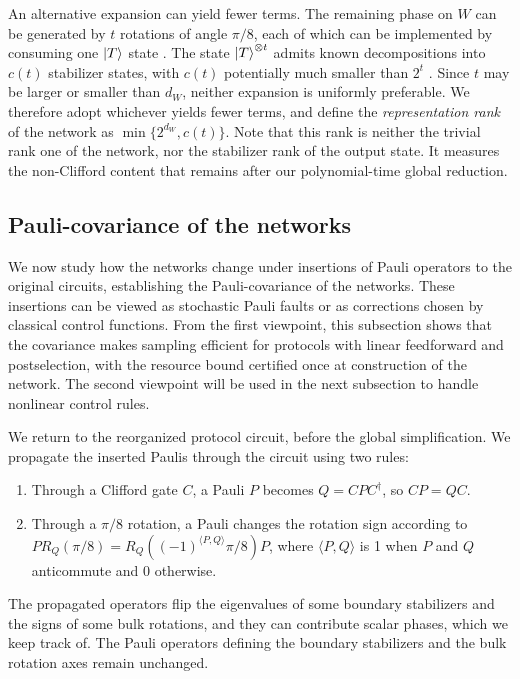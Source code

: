\documentclass[aps,prx,twocolumn,superscriptaddress,longbibliography]{revtex4-2}
\begin{document}
An alternative expansion can yield fewer terms. 
The remaining phase on $W$ can be generated by $t$ rotations of angle $\pi/8$, 
each of which can be implemented by consuming one $\ket{T}$ state \cite{litinskiGameSurfaceCodes2019}. 
The state $\ket{T}^{\otimes t}$ admits known decompositions into $c(t)$ stabilizer states, 
with $c(t)$ potentially much smaller than $2^t$ \cite{bravyiTradingClassicalQuantum2016}. 
Since $t$ may be larger or smaller than $d_W$, neither expansion is uniformly preferable. 
We therefore adopt whichever yields fewer terms, 
and define the \emph{representation rank} of the network as $\min\{2^{d_W},c(t)\}$.
Note that this rank is neither the trivial rank one of the network,
nor the stabilizer rank of the output state.
It measures the non-Clifford content that remains after our polynomial-time global reduction.

\subsection{Pauli-covariance of the networks}
\label{sec:pauli-stability}

We now study how the networks change under insertions of Pauli operators to the original circuits,
establishing the Pauli-covariance of the networks.
These insertions can be viewed as stochastic Pauli faults
or as corrections chosen by classical control functions.
From the first viewpoint, this subsection shows that the covariance makes sampling efficient
for protocols with linear feedforward and postselection,
with the resource bound certified once at construction of the network.
The second viewpoint will be used in the next subsection to handle nonlinear control rules.

We return to the reorganized protocol circuit,
before the global simplification.
We propagate the inserted Paulis through the circuit using two rules:
\begin{enumerate}
      \item Through a Clifford gate $C$, a Pauli $P$ becomes $Q=CPC^\dagger$,
      so $CP=QC$.
      \item Through a $\pi/8$ rotation, a Pauli changes the rotation sign according to
      $P R_Q(\pi/8)=R_Q((-1)^{\langle P,Q\rangle}\pi/8)P$,
      where $\langle P,Q\rangle$ is 1 when $P$ and $Q$ anticommute and 0 otherwise.
\end{enumerate}
The propagated operators flip the eigenvalues of some boundary stabilizers
and the signs of some bulk rotations, and they can contribute scalar phases, which we keep track of.
The Pauli operators defining the boundary stabilizers and the bulk rotation axes remain unchanged.
\end{document}
